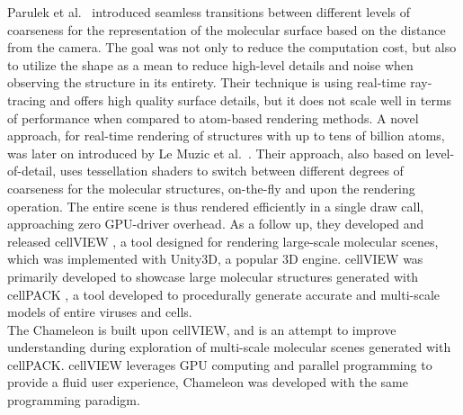 \documentclass[review,journal]{vgtc}         %
\begin{document}
	Parulek et al.~\cite{parulek2014continuous} introduced seamless transitions between different levels of coarseness for the representation of the molecular surface based on the distance from the camera.
	The goal was not only to reduce the computation cost, but also to utilize the shape as a mean to reduce high-level details and noise when observing the structure in its entirety.
	Their technique is using real-time ray-tracing and offers high quality surface details, but it does not scale well in terms of performance when compared to atom-based rendering methods.
	A novel approach, for real-time rendering of structures with up to tens of billion atoms, was later on introduced by Le Muzic et al.~\cite{le2014illustrative}. 
	Their approach, also based on level-of-detail, uses tessellation shaders to switch between different degrees of coarseness for the molecular structures, on-the-fly and upon the rendering operation.
	The entire scene is thus rendered efficiently in a single draw call, approaching zero GPU-driver overhead. 
	As a follow up, they developed and released cellVIEW \cite{muzic2015cellview}, a tool designed for rendering large-scale molecular scenes, which was implemented with Unity3D, a popular 3D engine.
	cellVIEW was primarily developed to showcase large molecular structures generated with cellPACK \cite{johnson2015cellpack}, a tool developed to procedurally generate accurate and multi-scale models of entire viruses and cells.\\
	
	The Chameleon is built upon cellVIEW, and is an attempt to improve understanding during exploration of multi-scale molecular scenes generated with cellPACK.
	cellVIEW leverages GPU computing and parallel programming to provide a fluid user experience, Chameleon was developed with the same programming paradigm.
	
%	
\end{document}
